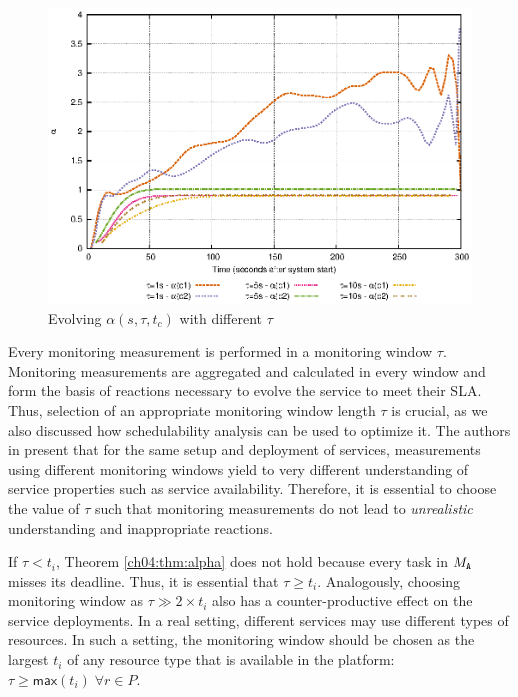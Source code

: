 % 
\begin{figure}[h]
\begin{center}
\includegraphics[scale=0.6]{figs/alpha.eps}  
\end{center}
\caption{Evolving $\alpha(s,\tau,t_c)$ with different $\tau$}
\label{ch04:fig:alpha}
\end{figure}
%

Every monitoring measurement is performed in a monitoring window $\tau$.
Monitoring measurements are aggregated and calculated in every window and form the basis of reactions necessary to evolve the service to meet their SLA.
Thus, selection of an appropriate monitoring window length $\tau$ is crucial, as we also discussed how schedulability analysis can be used to optimize it.
The authors in \cite{hogben2013defavail} present that for the same setup and deployment of services, measurements using different monitoring windows yield to very different understanding of service properties such as service availability.
Therefore, it is essential to choose the value of $\tau$ such that monitoring measurements do not lead to \emph{unrealistic} understanding and inappropriate reactions.

If $\tau < t_i$, Theorem \ref{ch04:thm:alpha} does not hold because every task  in $M_{{\scriptsize\texttt{A}}}$ misses its deadline.
Thus, it is essential that $\tau \geq t_i$.
Analogously, choosing monitoring window as $\tau \gg 2 \times t_i$ also has a counter-productive effect on the service deployments.
% 
In a real setting, different services may use different types of resources.
In such a setting, the monitoring window should be chosen as the largest $t_i$ of any resource type that is available in the platform: $\tau \geq \mathsf{max}(t_i) \; \forall r \in P$.


